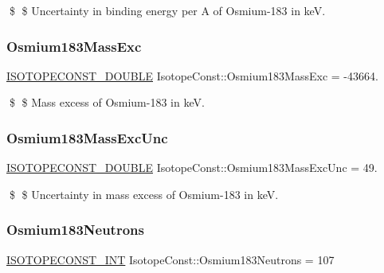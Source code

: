 \$ \$ Uncertainty in binding energy per A of Osmium-\/183 in keV. \mbox{\label{group___isotope_const-_osmium-_os183_ga17c31ffd42c9af0a922003f2f75cdeba}} 
\subsubsection{\texorpdfstring{Osmium183\+Mass\+Exc}{Osmium183MassExc}}
{\footnotesize\ttfamily \mbox{\hyperlink{group___isotope_const-_macros_ga8f45a7272ce02c0b4c65c44636ed719a}{I\+S\+O\+T\+O\+P\+E\+C\+O\+N\+S\+T\+\_\+\+D\+O\+U\+B\+LE}} Isotope\+Const\+::\+Osmium183\+Mass\+Exc = -\/43664.}

\$ \$ Mass excess of Osmium-\/183 in keV. \mbox{\label{group___isotope_const-_osmium-_os183_gab15a125577a50e8a6b840b8aee329cf2}} 
\subsubsection{\texorpdfstring{Osmium183\+Mass\+Exc\+Unc}{Osmium183MassExcUnc}}
{\footnotesize\ttfamily \mbox{\hyperlink{group___isotope_const-_macros_ga8f45a7272ce02c0b4c65c44636ed719a}{I\+S\+O\+T\+O\+P\+E\+C\+O\+N\+S\+T\+\_\+\+D\+O\+U\+B\+LE}} Isotope\+Const\+::\+Osmium183\+Mass\+Exc\+Unc = 49.}

\$ \$ Uncertainty in mass excess of Osmium-\/183 in keV. \mbox{\label{group___isotope_const-_osmium-_os183_gac2c7985f6b9f7f050349fe92d4948ed7}} 
\subsubsection{\texorpdfstring{Osmium183\+Neutrons}{Osmium183Neutrons}}
{\footnotesize\ttfamily \mbox{\hyperlink{group___isotope_const-_macros_ga5f18360b3e99483a35c32d789e62621c}{I\+S\+O\+T\+O\+P\+E\+C\+O\+N\+S\+T\+\_\+\+I\+NT}} Isotope\+Const\+::\+Osmium183\+Neutrons = 107}

